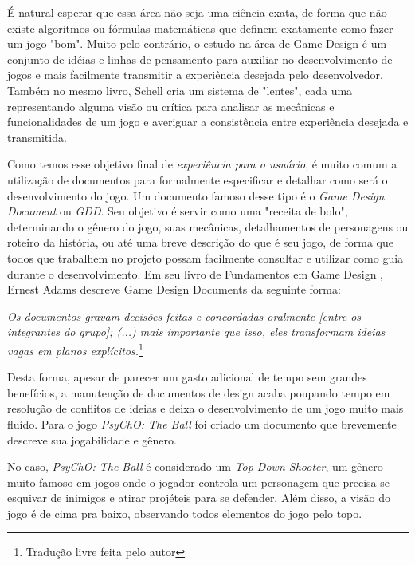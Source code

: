É natural esperar que essa área não seja uma ciência exata, de forma que não existe algoritmos ou fórmulas matemáticas que definem exatamente como fazer um jogo "bom". Muito pelo contrário, o estudo na área de Game Design é um conjunto de idéias e linhas de pensamento para auxiliar no desenvolvimento de jogos e mais facilmente transmitir a experiência desejada pelo desenvolvedor. Também no mesmo livro\cite{jessegamedesign}, Schell cria um sistema de "lentes", cada uma representando alguma visão ou crítica para analisar as mecânicas e funcionalidades de um jogo e averiguar a consistência entre experiência desejada e transmitida.

Como temos esse objetivo final de \textit{experiência para o usuário}, é muito comum a utilização de documentos para formalmente especificar e detalhar como será o desenvolvimento do jogo. Um documento famoso desse tipo é o \textit{Game Design Document} ou \textit{GDD}. Seu objetivo é servir como uma "receita de bolo", determinando o gênero do jogo, suas mecânicas, detalhamentos de personagens ou roteiro da história, ou até uma breve descrição do que é seu jogo, de forma que todos que trabalhem no projeto possam facilmente consultar e utilizar como guia durante o desenvolvimento. Em seu livro de Fundamentos em Game Design \cite{ernestgamedesign}, Ernest Adams descreve Game Design Documents da seguinte forma:

\begin{displayquote}
  \textit{Os documentos gravam decisões feitas e concordadas oralmente [entre os integrantes do grupo]; (...) mais importante que isso, eles transformam ideias vagas em planos explícitos.}\footnote{Tradução livre feita pelo autor}
\end{displayquote}

Desta forma, apesar de parecer um gasto adicional de tempo sem grandes benefícios, a manutenção de documentos de design acaba poupando tempo em resolução de conflitos de ideias e deixa o desenvolvimento de um jogo muito mais fluído. Para o jogo \textit{PsyChO: The Ball} foi criado um documento que brevemente descreve sua jogabilidade e gênero.

No caso, \textit{PsyChO: The Ball} é considerado um \textit{Top Down Shooter}, um gênero muito famoso em jogos onde o jogador controla um personagem que precisa se esquivar de inimigos e atirar projéteis para se defender. Além disso, a visão do jogo é de cima pra baixo, observando todos elementos do jogo pelo topo.\\

